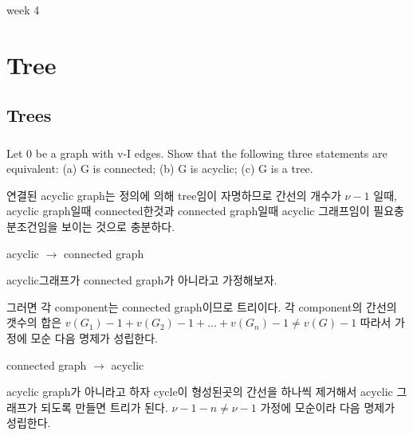\documentclass{oblivoir}
\begin{document}
week 4
\section{Tree}
\subsection{Trees}
\subsubsection{} 
%
\subsubsection{} 
%
\subsubsection{} 
%
\subsubsection{} 
%
\subsubsection{} 
Let 0 be a graph with v-I edges. Show that the following three statements are equivalent: 
(a) G is connected;
(b) G is acyclic;
(c) G is a tree.

연결된 acyclic graph는 정의에 의해 tree임이 자명하므로 간선의 개수가 $\nu -1$  일때, acyclic graph일때 connected한것과 connected graph일때 acyclic 그래프임이 필요충분조건임을 보이는 것으로 충분하다.

acyclic $\rightarrow$ connected graph

acyclic그래프가 connected graph가 아니라고 가정해보자.

그러면 각 component는 connected graph이므로 트리이다.
각 component의 간선의 갯수의 합은 $v(G_1)-1 + v(G_2)-1 + ... + v(G_n)-1 \neq v(G)-1 $
따라서 가정에 모순 다음 명제가 성립한다.

connected graph $\rightarrow$ acyclic

acyclic graph가 아니라고 하자 cycle이 형성된곳의 간선을 하나씩 제거해서 acyclic 그래프가 되도록 만들면 트리가 된다.
$\nu-1-n \neq \nu -1 $ 가정에 모순이라 다음 명제가 성립한다.
\subsubsection{} 
%
\subsubsection{} 
%
\end{document}
